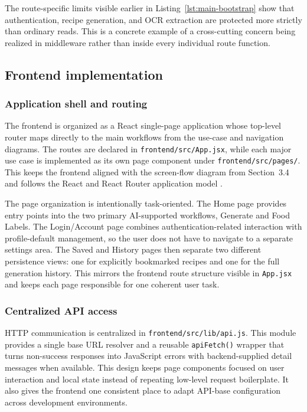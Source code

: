 The route-specific limits visible earlier in Listing~\ref{lst:main-bootstrap}
show that authentication, recipe generation, and OCR extraction are
protected more strictly than ordinary reads. This is a concrete example
of a cross-cutting concern being realized in middleware rather than
inside every individual route function.

\subsection{Frontend implementation}

\subsubsection{Application shell and routing}

The frontend is organized as a React single-page application whose
top-level router maps directly to the main workflows from the use-case
and navigation diagrams. The routes are declared in
\texttt{frontend/src/App.jsx}, while each major use case is implemented
as its own page component under \texttt{frontend/src/pages/}. This
keeps the frontend aligned with the screen-flow diagram from
Section~3.4 and follows the React and React Router application model
\cite{react2026docs,reactrouter2026docs}.

The page organization is intentionally task-oriented. The Home page
provides entry points into the two primary AI-supported workflows,
Generate and Food Labels. The Login/Account page combines
authentication-related interaction with profile-default management, so
the user does not have to navigate to a separate settings area. The
Saved and History pages then separate two different persistence views:
one for explicitly bookmarked recipes and one for the full generation
history. This mirrors the frontend route structure visible in
\texttt{App.jsx} and keeps each page responsible for one coherent user
task.

\subsubsection{Centralized API access}

HTTP communication \cite{http2022rfc9110} is centralized in
\texttt{frontend/src/lib/api.js}. This module provides a single base URL
resolver and a reusable
\texttt{apiFetch()} wrapper that turns non-success responses into
JavaScript errors with backend-supplied detail messages when available.
This design keeps page components focused on user interaction and local
state instead of repeating low-level request boilerplate. It also gives
the frontend one consistent place to adapt API-base configuration across
development environments.

